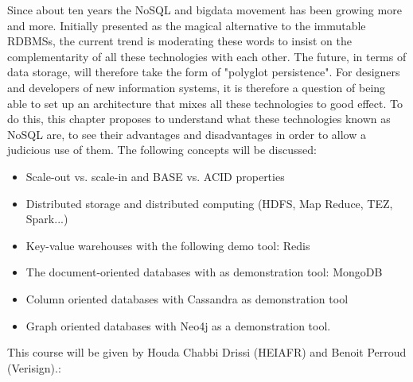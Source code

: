 Since about ten years the NoSQL and bigdata movement has been growing more and more. Initially presented as the magical alternative to the immutable RDBMSs, the current trend is moderating these words to insist on the complementarity of all these technologies with each other. The future, in terms of data storage, will therefore take the form of "polyglot persistence". For designers and developers of new information systems, it is therefore a question of being able to set up an architecture that mixes all these technologies to good effect. To do this, this chapter proposes to understand what these technologies known as NoSQL are, to see their advantages and disadvantages in order to allow a judicious use of them. The following concepts will be discussed:
\begin{itemize}
    \item Scale-out vs. scale-in and BASE vs. ACID properties
    \item Distributed storage and distributed computing (HDFS, Map Reduce, TEZ, Spark...)
    \item Key-value warehouses with the following demo tool: Redis
    \item The document-oriented databases with as demonstration tool: MongoDB
    \item Column oriented databases with Cassandra as demonstration tool
    \item Graph oriented databases with Neo4j as a demonstration tool.
\end{itemize}
This course will be given by Houda Chabbi Drissi (HEIAFR) and Benoit Perroud (Verisign).: